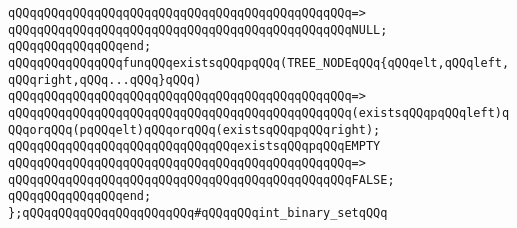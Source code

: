 \verb|qQQqqQQqqQQqqQQqqQQqqQQqqQQqqQQqqQQqqQQqqQQqqQQq=>|\newline
\verb|qQQqqQQqqQQqqQQqqQQqqQQqqQQqqQQqqQQqqQQqqQQqqQQqNULL;|\newline
\verb|qQQqqQQqqQQqqQQqend;|\newline
\newline
\verb|qQQqqQQqqQQqqQQqfunqQQqexistsqQQqpqQQq(TREE_NODEqQQq{qQQqelt,qQQqleft,qQQqright,qQQq...qQQq}qQQq)|\newline
\verb|qQQqqQQqqQQqqQQqqQQqqQQqqQQqqQQqqQQqqQQqqQQqqQQq=>|\newline
\verb|qQQqqQQqqQQqqQQqqQQqqQQqqQQqqQQqqQQqqQQqqQQqqQQq(existsqQQqpqQQqleft)qQQqorqQQq(pqQQqelt)qQQqorqQQq(existsqQQqpqQQqright);|\newline
\newline
\verb|qQQqqQQqqQQqqQQqqQQqqQQqqQQqqQQqexistsqQQqpqQQqEMPTY|\newline
\verb|qQQqqQQqqQQqqQQqqQQqqQQqqQQqqQQqqQQqqQQqqQQqqQQq=>|\newline
\verb|qQQqqQQqqQQqqQQqqQQqqQQqqQQqqQQqqQQqqQQqqQQqqQQqFALSE;|\newline
\verb|qQQqqQQqqQQqqQQqend;|\newline
\newline
\verb|};qQQqqQQqqQQqqQQqqQQqqQQq#qQQqqQQqint_binary_setqQQq|\newline
\newline

